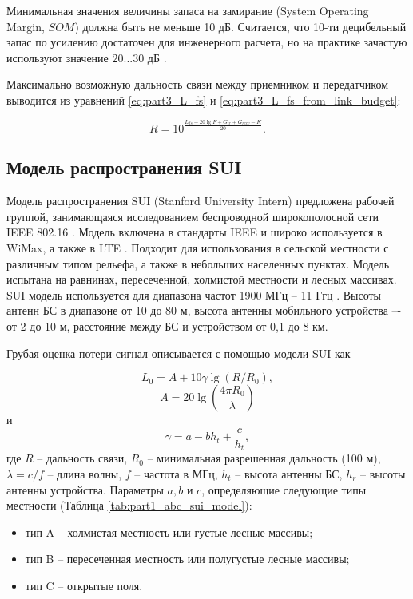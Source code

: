 Минимальная значения величины запаса на замирание  (System Operating Margin, $SOM$) должна быть не меньше  10 дБ. Считается, что 10-ти децибельный запас по усилению достаточен для инженерного расчета, но на практике зачастую используют значение $20 ... 30$ дБ \cite{Proletarsky}.







Максимально возможную дальность связи между приемником и передатчиком выводится из уравнений \cref{eq:part3_L_fs} и \cref{eq:part3_L_fs_from_link_budget}:

\begin{equation}
  \label{eq:part1_fspl_model_r}
  R = 10^\frac{L_{fs} - 20\lg{F} + G_{tr} + G_{recv} - K}{20}.
\end{equation}





\subsection{Модель распространения SUI}

Модель распространения SUI (Stanford University Intern) предложена рабочей группой, занимающаяся исследованием беспроводной широкополосной сети IEEE 802.16 \cite{Mollel2014}. Модель включена в стандарты IEEE и широко используется в WiMax, а также в LTE \cite{Zreikat2017}. Подходит для использования в сельской местности с различным типом рельефа, а также в небольших населенных пунктах. Модель испытана на равнинах, пересеченной, холмистой местности и лесных массивах. SUI модель используется для диапазона частот 1900 МГц -- 11 Ггц \cite{Cabuk2020}. Высоты антенн БС в диапазоне от 10 до 80 м, высота антенны мобильного устройства –- от 2 до 10 м, расстояние между БС и устройством от 0,1 до 8 км.

Грубая оценка потери сигнал описывается с помощью модели SUI как

\begin{equation}
  \label{eq:part1_sui_l0}
  L_0 = A + 10\gamma\lg{(R/R_0)},
\end{equation}
$$
A = 20\lg{(\frac{4\pi R_0 }{\lambda})}
$$
и
$$
\gamma = a - b h_t + \frac{c}{h_t}, 
$$
где $R$ -- дальность связи, $R_0$ -- минимальная разрешенная дальность (100 м), $\lambda = c / f$ -- длина волны, $f$ -- частота в МГц, $h_t$ -- высота антенны БС, $h_r$ -- высоты антенны устройства. Параметры $a, b$ и $c$, определяющие следующие типы местности (Таблица \cref{tab:part1_abc_sui_model}):
\begin{itemize}
  \item тип A -- холмистая местность или густые лесные массивы;
  \item тип B -- пересеченная местность или полугустые лесные массивы;
  \item тип C -- открытые поля.
\end{itemize}


